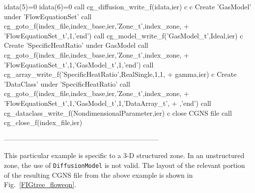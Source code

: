 \documentclass[12pt]{article}
\begin{document}
{\newline\indent      idata(5)=0
\newline\indent      idata(6)=0
\newline\indent      call cg\_diffusion\_write\_f(idata,ier)
\newline c
\newline c   Create 'GasModel' under 'FlowEquationSet'
\newline\indent      call cg\_goto\_f(index\_file,index\_base,ier,'Zone\_t',index\_zone,
\newline + \indent 'FlowEquationSet\_t',1,'end')
\newline\indent      call cg\_model\_write\_f('GasModel\_t',Ideal,ier)
\newline c   Create 'SpecificHeatRatio' under GasModel
\newline\indent      call cg\_goto\_f(index\_file,index\_base,ier,'Zone\_t',index\_zone,
\newline + \indent 'FlowEquationSet\_t',1,'GasModel\_t',1,'end')
\newline\indent      call cg\_array\_write\_f('SpecificHeatRatio',RealSingle,1,1,
\newline + \indent gamma,ier)
\newline c   Create 'DataClass' under 'SpecificHeatRatio'
\newline\indent      call cg\_goto\_f(index\_file,index\_base,ier,'Zone\_t',index\_zone,
\newline + \indent 'FlowEquationSet\_t',1,'GasModel\_t',1,'DataArray\_t',
\newline + ,'end')
\newline\indent      call cg\_dataclass\_write\_f(NondimensionalParameter,ier)
\newline c   close CGNS file
\newline\indent      call cg\_close\_f(index\_file,ier)
}

--------------------------------------------------------------------

This particular example is specific to a 3-D structured zone.
In an unstructured zone, the use of {\tt DiffusionModel} is not valid.
The layout of the relevant portion of the resulting CGNS file
from the above example is shown in Fig.~\ref{FIGtree_floweqn}.
\end{document}
